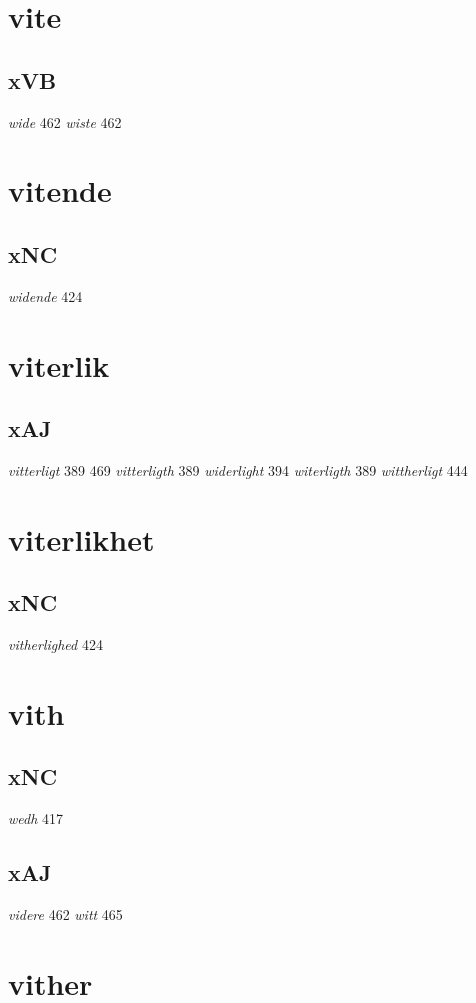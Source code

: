 \documentclass[a4paper,twocolumn]{article}
\begin{document}
\section{vite}
\label{sec:org71897b5}
\subsection{xVB}
\label{sec:org1ccdda4}
\emph{wide} 462 \emph{wiste} 462 
\section{vitende}
\label{sec:org65aa8cf}
\subsection{xNC}
\label{sec:org4ae2e02}
\emph{widende} 424 
\section{viterlik}
\label{sec:orga1744c0}
\subsection{xAJ}
\label{sec:org9a632b9}
\emph{vitterligt} 389 469 \emph{vitterligth} 389 \emph{widerlight} 394 \emph{witerligth} 389 \emph{wittherligt} 444 
\section{viterlikhet}
\label{sec:org5b54df0}
\subsection{xNC}
\label{sec:orgcf79acf}
\emph{vitherlighed} 424 
\section{vith}
\label{sec:org25b2322}
\subsection{xNC}
\label{sec:org6a2e75b}
\emph{wedh} 417 
\subsection{xAJ}
\label{sec:org286567d}
\emph{videre} 462 \emph{witt} 465 
\section{vither}
\label{sec:org330782e}
\end{document}
